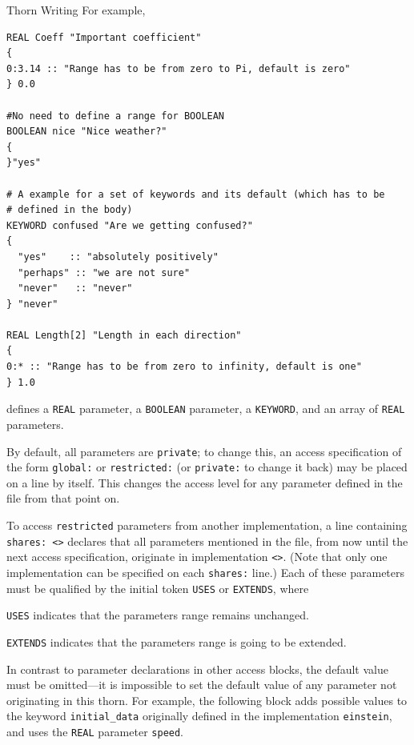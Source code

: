 \begin{cactuspart}{Thorn Writing}
For example,
\begin{verbatim}
REAL Coeff "Important coefficient"
{
0:3.14 :: "Range has to be from zero to Pi, default is zero"
} 0.0

#No need to define a range for BOOLEAN
BOOLEAN nice "Nice weather?"
{
}"yes"

# A example for a set of keywords and its default (which has to be
# defined in the body)
KEYWORD confused "Are we getting confused?"
{
  "yes"    :: "absolutely positively"
  "perhaps" :: "we are not sure"
  "never"   :: "never"
} "never"

REAL Length[2] "Length in each direction"
{
0:* :: "Range has to be from zero to infinity, default is one"
} 1.0

\end{verbatim}
defines a \texttt{REAL} parameter, a \texttt{BOOLEAN} parameter, a \texttt{KEYWORD},
and an array of \texttt{REAL} parameters.

By default, all parameters are \texttt{private}; to change this, an access
specification of the form \texttt{global:} or \texttt{restricted:} (or
\texttt{private:} to change it back) may be placed on a line by itself.  This
changes the access level for any parameter defined in the file from that point on.

To access \texttt{restricted} parameters from another implementation, a line
containing \texttt{shares: <>} declares that all parameters mentioned in
the file, from now until the next access specification, originate in
implementation \texttt{<>}. (Note that only one implementation can be
specified on each \texttt{shares:} line.)  Each of these parameters must be qualified by the initial token \texttt{USES} or \texttt{EXTENDS}, where
\begin{Lentry}
\item[\texttt{USES}] indicates that the parameters range remains unchanged.
\item[\texttt{EXTENDS}] indicates that the parameters range is going to be extended.
\end{Lentry}

In contrast to parameter declarations in other access blocks, the default
value must be omitted---it is impossible to set the default value of any
parameter not originating in this thorn.
For example, the following block adds possible values to the keyword
\texttt{initial\_data} originally defined in the implementation \texttt{einstein},
and uses the \texttt{REAL} parameter \texttt{speed}.


\end{cactuspart}
